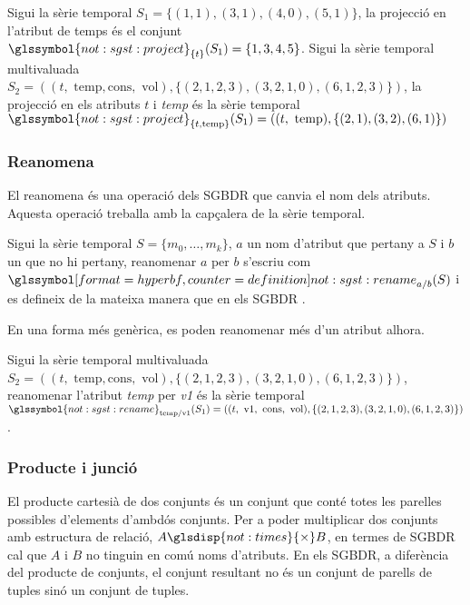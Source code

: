 \begin{example}
  Sigui la sèrie temporal $S_1=\{(1,1),(3,1),(4,0),(5,1)\}$, la
  projecció en l'atribut de temps és el conjunt
  $\glssymbol{not:sgst:project}_{\{t\}}(S_1) = \{ 1,3,4,5 \}$.  Sigui
  la sèrie temporal multivaluada $S_2 = ( (t,\text{ temp},\text{
    cons},\text{ vol}),\{ (2,1,2,3), (3,2,1,0), (6,1,2,3) \})$, la
  projecció en els atributs $t$ i \emph{temp} és la sèrie temporal
  $\glssymbol{not:sgst:project}_{ \{t,\text{temp}\}}(S_1) = (
  (t,\text{ temp}),\{ (2,1), (3,2), (6,1) \})$
\end{example}







\subsubsection{Reanomena}

El reanomena és una operació dels \gls{SGBDR} que canvia el nom dels
atributs.  Aquesta operació treballa amb la
capçalera de la sèrie temporal.


\begin{definition}[reanomena]
  Sigui la sèrie temporal $S=\{ m_0,\dotsc,m_k\}$, $a$ un nom
  d'atribut que pertany a $S$ i $b$ un que no hi pertany, reanomenar
  $a$ per $b$ s'escriu com $\glssymboldef{not:sgst:rename}_{a/b} (S)$
  i es defineix de la mateixa manera que en els
  \gls{SGBDR} \parencite[cap.~7]{date04:introduction8}.
\end{definition}

En una forma més genèrica, es poden reanomenar més d'un atribut
alhora.

\begin{example}
  Sigui la sèrie temporal multivaluada $S_2 = ( (t,\text{ temp},\text{
    cons},\text{ vol}),\{ (2,1,2,3), (3,2,1,0), (6,1,2,3) \})$, reanomenar 
  l'atribut \emph{temp} per \emph{v1} és la sèrie temporal
  $\glssymbol{not:sgst:rename}_{\text{temp}/\text{v1}}(S_1) = ( (t,\text{ v1},\text{
    cons},\text{ vol}),\{ (2,1,2,3), (3,2,1,0), (6,1,2,3) \})$.
\end{example}



\subsubsection{Producte i junció}

El producte cartesià de dos conjunts és un conjunt que conté totes les
parelles possibles d'elements d'ambdós conjunts.  Per a poder
multiplicar dos conjunts amb estructura de relació, $A
\glsdisp{not:times}{\times} B$, en termes de \gls{SGBDR} cal que $A$ i
$B$ no tinguin en comú noms d'atributs.  En els \gls{SGBDR}, a
diferència del producte de conjunts, el conjunt resultant no és un
conjunt de parells de tuples sinó un conjunt de tuples.

